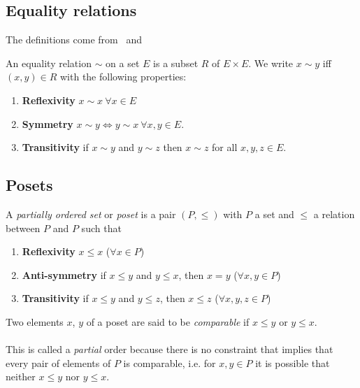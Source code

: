 \subsection{Equality relations}

The definitions come from~\cite{polytopes} and~\cite{incidenceGeometry}

\begin{definition}
  An equality relation $\sim$ on a set $E$ is a subset $R$ of $E \times E$. We write $x \sim y$ iff $(x,y) \in R$ with the following properties:
  \begin{enumerate}
    \item \textbf{Reflexivity} $x \sim x \ \forall x \in E$
    \item \textbf{Symmetry} $x \sim y \Leftrightarrow y\sim x \ \forall x,y \in E$.
    \item \textbf{Transitivity} if $x \sim y$ and $y \sim z$ then $x \sim z$ for all $x,y,z \in E$.
  \end{enumerate}
\end{definition}

\subsection{Posets}

\begin{definition}
  A \textit{partially ordered set} or \textit{poset} is a pair $(P,\le)$ with $P$ a set and $\le$ a relation between $P$ and $P$ such that
  \begin{enumerate}
    \item \textbf{Reflexivity} $x \le x$ ($\forall x \in P$)
    \item \textbf{Anti-symmetry} if $x \le y$ and $y \le x$, then $x = y$ ($\forall x,y \in P$)
    \item \textbf{Transitivity} if $x \le y$ and $y \le z$, then $x \le z$ ($\forall x,y,z \in P$)
  \end{enumerate}
\end{definition}

\begin{definition}[Comparability]
  Two elements $x$, $y$ of a poset are said to be \textit{comparable} if $x \le y$ or $y \le x$.
\end{definition}

\paragraph{}
This is called a \textit{partial} order because there is no constraint that implies that every pair of elements of $P$ is comparable, i.e. for $x,y \in P$ it is possible that neither $x \le y$ nor $y \le x$.

